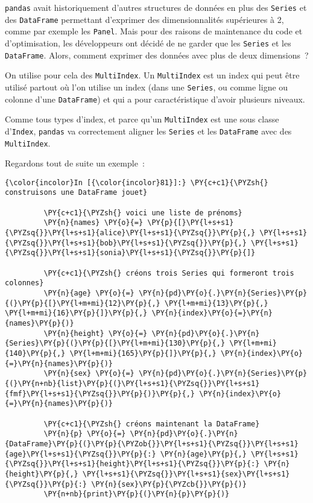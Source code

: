    \texttt{pandas} avait historiquement d'autres structures de données en
plus des \texttt{Series} et des \texttt{DataFrame} permettant d'exprimer
des dimensionnalités supérieures à 2, comme par exemple les
\texttt{Panel}. Mais pour des raisons de maintenance du code et
d'optimisation, les développeurs ont décidé de ne garder que les
\texttt{Series} et les \texttt{DataFrame}. Alors, comment exprimer des
données avec plus de deux dimensions~?

On utilise pour cela des \texttt{MultiIndex}. Un \texttt{MultiIndex} est
un index qui peut être utilisé partout où l'on utilise un index (dans
une \texttt{Series}, ou comme ligne ou colonne d'une \texttt{DataFrame})
et qui a pour caractéristique d'avoir plusieurs niveaux.

Comme tous types d'index, et parce qu'un \texttt{MultiIndex} est une
sous classe d'\texttt{Index}, \texttt{pandas} va correctement aligner
les \texttt{Series} et les \texttt{DataFrame} avec des
\texttt{MultiIndex}.

Regardons tout de suite un exemple~:

    \begin{Verbatim}[commandchars=\\\{\},frame=single,framerule=0.3mm,rulecolor=\color{cellframecolor}]
{\color{incolor}In [{\color{incolor}81}]:} \PY{c+c1}{\PYZsh{} construisons une DataFrame jouet}
         
         \PY{c+c1}{\PYZsh{} voici une liste de prénoms}
         \PY{n}{names} \PY{o}{=} \PY{p}{[}\PY{l+s+s1}{\PYZsq{}}\PY{l+s+s1}{alice}\PY{l+s+s1}{\PYZsq{}}\PY{p}{,} \PY{l+s+s1}{\PYZsq{}}\PY{l+s+s1}{bob}\PY{l+s+s1}{\PYZsq{}}\PY{p}{,} \PY{l+s+s1}{\PYZsq{}}\PY{l+s+s1}{sonia}\PY{l+s+s1}{\PYZsq{}}\PY{p}{]}
         
         \PY{c+c1}{\PYZsh{} créons trois Series qui formeront trois colonnes}
         \PY{n}{age} \PY{o}{=} \PY{n}{pd}\PY{o}{.}\PY{n}{Series}\PY{p}{(}\PY{p}{[}\PY{l+m+mi}{12}\PY{p}{,} \PY{l+m+mi}{13}\PY{p}{,} \PY{l+m+mi}{16}\PY{p}{]}\PY{p}{,} \PY{n}{index}\PY{o}{=}\PY{n}{names}\PY{p}{)}
         \PY{n}{height} \PY{o}{=} \PY{n}{pd}\PY{o}{.}\PY{n}{Series}\PY{p}{(}\PY{p}{[}\PY{l+m+mi}{130}\PY{p}{,} \PY{l+m+mi}{140}\PY{p}{,} \PY{l+m+mi}{165}\PY{p}{]}\PY{p}{,} \PY{n}{index}\PY{o}{=}\PY{n}{names}\PY{p}{)}
         \PY{n}{sex} \PY{o}{=} \PY{n}{pd}\PY{o}{.}\PY{n}{Series}\PY{p}{(}\PY{n+nb}{list}\PY{p}{(}\PY{l+s+s1}{\PYZsq{}}\PY{l+s+s1}{fmf}\PY{l+s+s1}{\PYZsq{}}\PY{p}{)}\PY{p}{,} \PY{n}{index}\PY{o}{=}\PY{n}{names}\PY{p}{)}
         
         \PY{c+c1}{\PYZsh{} créons maintenant la DataFrame}
         \PY{n}{p} \PY{o}{=} \PY{n}{pd}\PY{o}{.}\PY{n}{DataFrame}\PY{p}{(}\PY{p}{\PYZob{}}\PY{l+s+s1}{\PYZsq{}}\PY{l+s+s1}{age}\PY{l+s+s1}{\PYZsq{}}\PY{p}{:} \PY{n}{age}\PY{p}{,} \PY{l+s+s1}{\PYZsq{}}\PY{l+s+s1}{height}\PY{l+s+s1}{\PYZsq{}}\PY{p}{:} \PY{n}{height}\PY{p}{,} \PY{l+s+s1}{\PYZsq{}}\PY{l+s+s1}{sex}\PY{l+s+s1}{\PYZsq{}}\PY{p}{:} \PY{n}{sex}\PY{p}{\PYZcb{}}\PY{p}{)}
         \PY{n+nb}{print}\PY{p}{(}\PY{n}{p}\PY{p}{)}
\end{Verbatim}


